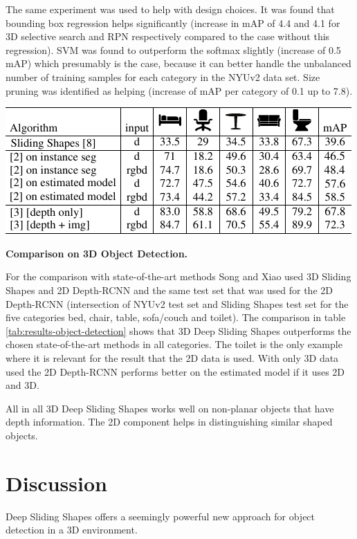 \documentclass[12pt]{scrartcl}
\begin{document}
The same experiment was used to help with design choices. It was found that
bounding box regression helps significantly (increase in mAP of 4.4 and 4.1
for 3D selective search and RPN respectively compared to the case without this
regression). SVM was found to outperform the softmax slightly (increase of 0.5 mAP)
which presumably is the case, because it can better handle the unbalanced number of
training samples for each category in the NYUv2 data set. Size pruning was identified
as helping (increase of mAP per category of 0.1 up to 7.8).

\begin{table}
    \centering
    \includegraphics{results-table-3}
    \caption{\textbf{Comparison on 3D Object Detection.}}
    \label{tab:results-object-detection}
\end{table}

For the comparison with state-of-the-art methods Song and Xiao used 3D Sliding
Shapes\cite{Song2014} and 2D Depth-RCNN\cite{Gupta2015} and the same test set
that was used for the 2D Depth-RCNN (intersection of NYUv2 test set and Sliding
Shapes test set for the five categories bed, chair, table, sofa/couch and toilet).
The comparison in table \ref{tab:results-object-detection} shows that 3D Deep
Sliding Shapes outperforms the chosen state-of-the-art methods in all categories.
The toilet is the only example where it is relevant for the result that the 2D
data is used. With only 3D data used the 2D Depth-RCNN performs better on the
estimated model if it uses 2D and 3D.

All in all 3D Deep Sliding Shapes works well on non-planar objects that have depth
information. The 2D component helps in distinguishing similar shaped objects.

\section{Discussion} %
\label{sec:discussion}

Deep Sliding Shapes offers a seemingly powerful new approach for object detection
in a 3D environment.
\end{document}
